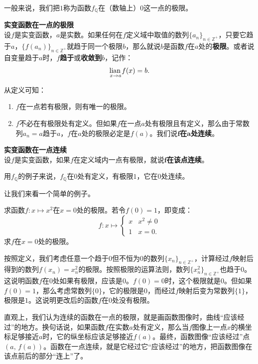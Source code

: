 \documentclass[12pt,UTF8,fontset=none]{ctexbook}
\begin{document}
一般来说，我们把$1$称为函数$f_{\mathbb{Q}}$在（数轴上）$0$这一点的极限。
\begin{df}\textbf{实变函数在一点的极限}
    \mbox{}\\
    设$f$是实变函数，$a$是实数。如果任何在$f$定义域中取值的数列$\{a_n\}_{n\in\mathbb{Z}^+}$，只要它趋于$a$，$\{f(a_n)\}_{n\in\mathbb{Z}^+}$就趋于同一个极限$b$，那么就说$b$是函数$f$在$a$处的\textbf{极限}。或者说自变量趋于$a$时，$f$\textbf{趋于}或\textbf{收敛到}$b$，记作：
    $$  \underset{x \to a}{\operatorname{lian}\,} f(x) = b. $$
\end{df}
从定义可知：
\begin{enumerate}
    \item $f$在一点若有极限，则有唯一的极限。
    \item $f$不必在有极限处有定义。但如果$f$在一点$a$处有极限且有定义，那么由于常数列$a_n = a$趋于$a$，$f$在$a$处的极限必定是$f(a)$。我们说$\boldsymbol{f}$\textbf{在}$\boldsymbol{a}$\textbf{处连续}。
\end{enumerate}
\begin{df}{\textbf{实变函数在一点连续}}
    \mbox{}\\
    设$f$是实变函数，如果$f$在定义域内一点有极限，就说$\boldsymbol{f}$\textbf{在该点连续}。
\end{df}
用$f_{\mathbb{Q}}$的例子来说，$f_{\mathbb{Q}}$在$0$处有定义，有极限$1$，它在$0$处连续。

让我们来看一个简单的例子。
\begin{et}
    求函数$f: x\mapsto x^2$在$x=0$处的极限。若令$f(0) = 1$，即变成：
    $$f:x\mapsto \begin{cases}
    x & x^2 \neq 0 \\
    1 & x = 0.
    \end{cases}$$
    求$f$在$x=0$处的极限。
\end{et}
\begin{so}
    按照定义，我们考虑任意一个趋于$0$但不恒为$0$的数列$\{x_n\}_{n\in\mathbb{Z}^+}$，计算经过$f$映射后得到的数列$f(x_n) = x_n^2$的极限。按照极限的运算法则，数列$\{x_n^2\}_{n\in\mathbb{Z}^+}$也趋于$0$。这说明函数$f$在$0$处如果有极限，应该是$0$。$f(0)=0$时，这个极限就是$0$。但如果$f(0)=1$，那么考虑常数列$\{0\}$，它的极限是$0$，而经过$f$映射后变为常数列$\{1\}$，极限是$1$。这说明更改后的函数$f$在$0$处没有极限。
\end{so}

直观上，我们认为连续的函数在一点的极限，就是画函数图像时，曲线“应该经过”的地方。换句话说，如果函数$f$在实数$a$处有定义，那么当$f$图像上一点$x$的横坐标足够接近$a$时，它的纵坐标应该足够接近$f(a)$。最终，函数图像“应该经过”点$(a,\,f(a))$。函数在一点连续，就是它经过它“应该经过”的地方，把函数图像在该点前后的部分“连上”了。
\end{document}

